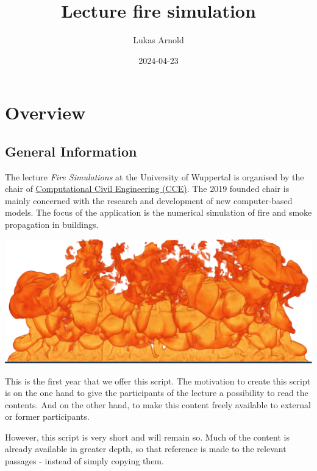 \documentclass[
  letterpaper,
  DIV=11,
  numbers=noendperiod]{scrreprt}
\title{Lecture fire simulation}
\author{Lukas Arnold}
\date{2024-04-23}
\renewcommand*\contentsname{Table of contents}
\newcommand\contentsname{Table of contents}
\begin{document}
\maketitle

\renewcommand*\contentsname{Table of contents}
{
\hypersetup{linkcolor=}
\setcounter{tocdepth}{2}
\tableofcontents
}

\chapter*{Overview}\label{overview}


\section*{General Information}\label{general-information}


The lecture \emph{Fire Simulations} at the University of Wuppertal is
organised by the chair of
\href{https://cce.uni-wuppertal.de/}{Computational Civil Engineering
(CCE)}. The 2019 founded chair is mainly concerned with the research and
development of new computer-based models. The focus of the application
is the numerical simulation of fire and smoke propagation in buildings.

\includegraphics{./content/00_overview/figs/fire_banner.png}

This is the first year that we offer this script. The motivation to
create this script is on the one hand to give the participants of the
lecture a possibility to read the contents. And on the other hand, to
make this content freely available to external or former participants.

However, this script is very short and will remain so. Much of the
content is already available in greater depth, so that reference is made
to the relevant passages - instead of simply copying them.
\end{document}
